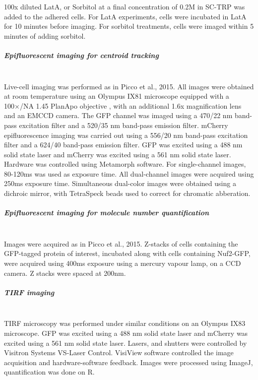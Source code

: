 100x diluted LatA, or Sorbitol at a final concentration of 0.2M in SC-TRP was added to the adhered cells. For LatA experiments, cells were incubated in LatA for 10 minutes before imaging. For sorbitol treatments, cells were imaged within 5 minutes of adding sorbitol.

\subparagraph{Epifluorescent imaging for centroid tracking}
			\mbox{}\\
Live-cell imaging was performed as in Picco et al., 2015. All images were obtained at room temperature using an Olympus IX81 microscope equipped with a 100×/NA 1.45 PlanApo objective , with an additional 1.6x magnification lens and an EMCCD camera. The GFP channel was imaged using a 470/22 nm band-pass excitation filter and a 520/35 nm band-pass emission filter. mCherry epifluorescence imaging was carried out using a 556/20 nm band-pass excitation filter and a 624/40 band-pass emission filter. GFP was excited using a 488 nm solid state laser and mCherry was excited using a 561 nm solid state laser. Hardware was controlled using Metamorph software. For single-channel images, 80-120ms was used as exposure time. All dual-channel images were acquired using 250ms exposure time. Simultaneous dual-color images were obtained using a dichroic mirror, with TetraSpeck beads used to correct for chromatic abberation.

\subparagraph{Epifluorescent imaging for molecule number quantification}
			\mbox{}\\
Images were acquired as in Picco et al., 2015. Z-stacks of cells containing the GFP-tagged protein of interest, incubated along with cells containing Nuf2-GFP, were acquired using 400ms exposure using a mercury vapour lamp, on a CCD camera. Z stacks were spaced at 200nm. 

\subparagraph{TIRF imaging}
			\mbox{}\\
TIRF microscopy was performed under similar conditions on an Olympus IX83 microscope. GFP was excited using a 488 nm solid state laser and mCherry was excited using a 561 nm solid state laser. Lasers, and shutters were controlled by Visitron Systems VS-Laser Control. VisiView software controlled the image acquisition and hardware-software feedback.
Images were processed using ImageJ, quantification was done on R.

